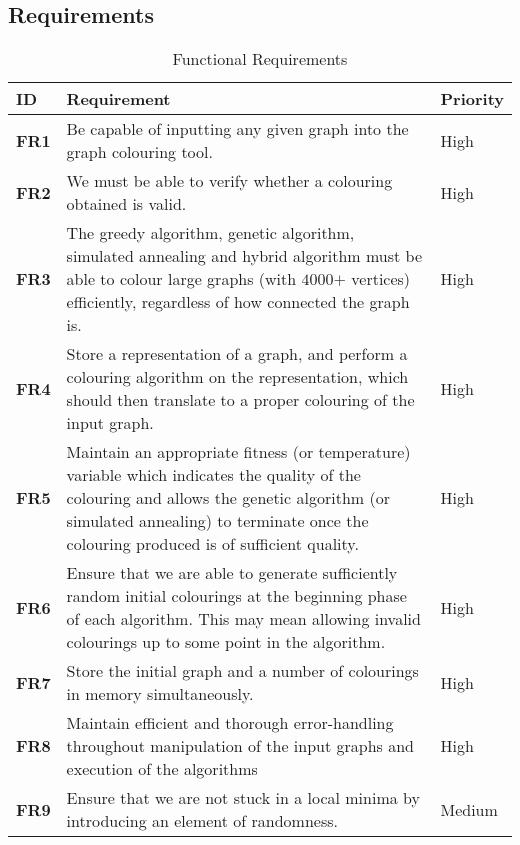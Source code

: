 \documentclass[12pt,a4paper]{article}
\begin{document}
\subsection*{Requirements}
\begin{longtable}{|p{1.2cm}|p{12cm}|p{1.4cm}|}
\caption{Functional Requirements}\\
\hline
\label{functional}
\bf{ID} & \bf{Requirement} & \bf{Priority} \\ \hline
\textbf{FR1} & Be capable of inputting any given graph into the graph colouring tool. & High \\ \hline
\textbf{FR2} & We must be able to verify whether a colouring obtained is valid. & High \\ \hline
\textbf{FR3} & The greedy algorithm, genetic algorithm, simulated annealing and hybrid algorithm must be able to colour large graphs (with $4000\texttt{+}$ vertices) efficiently, regardless of how connected the graph is.& High \\ \hline
\textbf{FR4} & Store a representation of a graph, and perform a colouring algorithm on the representation, which should then translate to a proper colouring of the input graph. & High \\ \hline
\textbf{FR5} & Maintain an appropriate fitness (or temperature) variable which indicates the quality of the colouring and allows the genetic algorithm (or simulated annealing) to terminate once the colouring produced is of sufficient quality. & High \\ \hline
\textbf{FR6} & Ensure that we are able to generate sufficiently random initial colourings at the beginning phase of each algorithm. This may mean allowing invalid colourings up to some point in the algorithm. & High \\ \hline
\textbf{FR7} & Store the initial graph and a number of colourings in memory simultaneously. & High \\ \hline
\textbf{FR8} & Maintain efficient and thorough error-handling throughout manipulation of the input graphs and execution of the algorithms &  High \\ \hline
\textbf{FR9} & Ensure that we are not stuck in a local minima by introducing an element of randomness. & Medium \\ \hline
\end{longtable}
\end{document}
